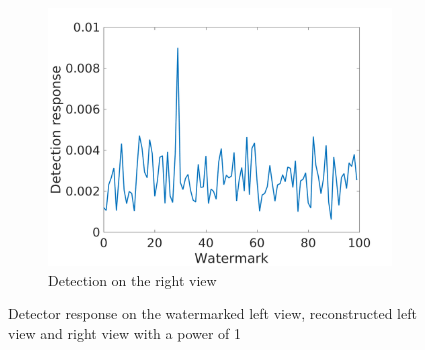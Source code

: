 \begin{figure}[h!]
\begin{subfigure}[t]{0.5\textwidth}
\end{subfigure}
\begin{subfigure}[t]{0.5\textwidth}
\centering
\includegraphics[width=1\textwidth]{./img/corr_gauss/right_warped_corr_value_1.png}
   \caption{\small{Detection on the right view}\label{fig:gr1}}
\end{subfigure}
\caption{Detector response on the watermarked left view, reconstructed left view and right view with a power of 1\label{fig:gauss11}}
\end{figure}


